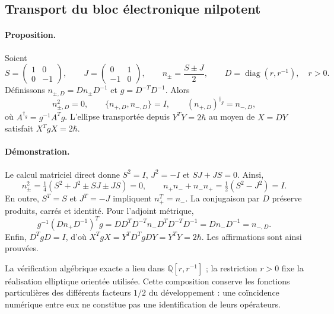 \subsection{Transport du bloc électronique nilpotent}
\label{md:compos:nilpotentes}

\paragraph{Proposition.}
Soient
\begin{equation}
 S=\begin{pmatrix}1&0\\0&-1\end{pmatrix},\qquad
 J=\begin{pmatrix}0&1\\-1&0\end{pmatrix},\qquad
 n_\pm=\frac{S\pm J}{2},\qquad
 D=\operatorname{diag}(r,r^{-1}),\quad r>0.
 \label{md:compos:bloque-nilpotente}
\end{equation}
Définissons $n_{\pm,D}=Dn_\pm D^{-1}$ et $g=D^{-T}D^{-1}$. Alors
\begin{equation}
 n_{\pm,D}^2=0,\qquad
 \{n_{+,D},n_{-,D}\}=I,\qquad
 (n_{+,D})^{\dagger_g}=n_{-,D},
 \label{md:compos:identidades-nilpotentes}
\end{equation}
où $A^{\dagger_g}=g^{-1}A^Tg$. L’ellipse transportée depuis
$Y^TY=2\hbar$ au moyen de $X=DY$ satisfait $X^TgX=2\hbar$.

\paragraph{Démonstration.}
Le calcul matriciel direct donne
$S^2=I$, $J^2=-I$ et $SJ+JS=0$. Ainsi,
\[
 n_\pm^2=\tfrac14(S^2+J^2\pm SJ\pm JS)=0,
 \qquad
 n_+n_-+n_-n_+=\tfrac12(S^2-J^2)=I.
\]
En outre, $S^T=S$ et $J^T=-J$ impliquent $n_+^T=n_-$. La conjugaison par $D$
préserve produits, carrés et identité. Pour l’adjoint métrique,
\[
 g^{-1}(Dn_+D^{-1})^Tg
 =DD^T D^{-T}n_-D^T D^{-T}D^{-1}
 =Dn_-D^{-1}=n_{-,D}.
\]
Enfin, $D^TgD=I$, d’où
$X^TgX=Y^TD^TgDY=Y^TY=2\hbar$. Les affirmations sont ainsi prouvées.

La vérification algébrique exacte a lieu dans
$\mathbb Q[r,r^{-1}]$ ; la restriction $r>0$ fixe la réalisation elliptique
orientée utilisée. Cette composition conserve les fonctions particulières
des différents facteurs $1/2$ du développement : une coïncidence numérique
entre eux ne constitue pas une identification de leurs opérateurs.
